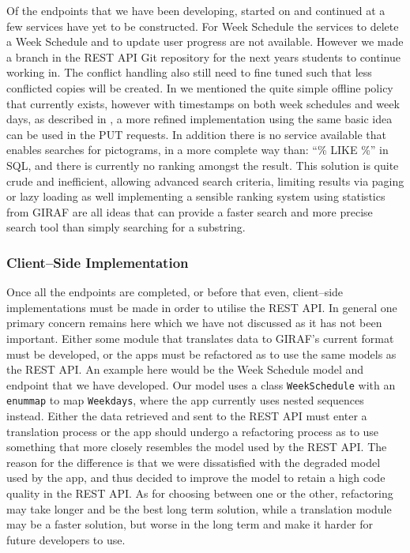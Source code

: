 Of the endpoints that we have been developing, started on  and continued at  a few services have yet to be constructed.
For Week Schedule the services to delete a Week Schedule and to update user progress are not available.
However we made a branch in the REST API Git repository for the next years students to continue working in.
The conflict handling also still need to fine tuned such that less conflicted copies will be created.
In  we mentioned the quite simple offline policy that currently exists, however with timestamps on both week schedules and week days, as described in , a more refined implementation using the same basic idea can be used in the PUT requests.
In addition there is no service available that enables searches for pictograms, in a more complete way than: ``\% LIKE \%'' in SQL, and there is currently no ranking amongst the result.
This solution is quite crude and inefficient, allowing advanced search criteria, limiting results via paging or lazy loading as well implementing a sensible ranking system using statistics from GIRAF are all ideas that can provide a faster search and more precise search tool than simply searching for a substring.


\subsubsection*{Client--Side Implementation}
Once all the endpoints are completed, or before that even, client--side implementations must be made in order to utilise the REST API.
In general one primary concern remains here which we have not discussed as it has not been important.
Either some module that translates data to GIRAF's current format must be developed, or the apps must be refactored as to use the same models as the REST API.
An example here would be the Week Schedule model and endpoint that we have developed.
Our model uses a class \texttt{WeekSchedule} with an \texttt{enummap} to map \texttt{Weekdays}, where the app currently uses nested sequences instead.
Either the data retrieved and sent to the REST API must enter a translation process or the app should undergo a refactoring process as to use something that more closely resembles the model used by the REST API.
The reason for the difference is that we were dissatisfied with the degraded model used by the app, and thus decided to improve the model to retain a high code quality in the REST API.
As for choosing between one or the other, refactoring may take longer and be the best long term solution, while a translation module may be a faster solution, but worse in the long term and make it harder for future developers to use.

